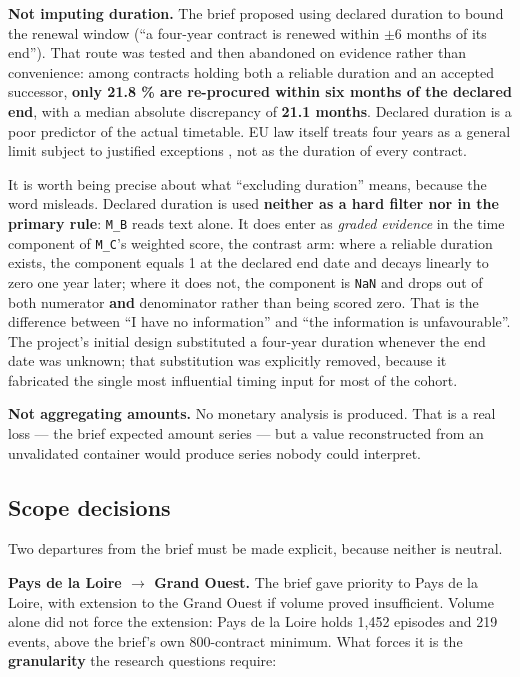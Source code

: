 \textbf{Not imputing duration.} The brief proposed using declared duration to bound the renewal window (``a four-year contract is renewed within $\pm$6 months of its end''). That route was tested and then abandoned on evidence rather than convenience: among contracts holding both a reliable duration and an accepted successor, \textbf{only 21.8 \% are re-procured within six months of the declared end}, with a median absolute discrepancy of \textbf{21.1 months}. Declared duration is a poor predictor of the actual timetable. EU law itself treats four years as a general limit subject to justified exceptions \citep[Art.~33]{eudir2014}, not as the duration of every contract.

It is worth being precise about what ``excluding duration'' means, because the word misleads. Declared duration is
used \textbf{neither as a hard filter nor in the primary rule}: \texttt{M\_B} reads text alone. It does enter as \emph{graded
evidence} in the time component of \texttt{M\_C}'s weighted score, the contrast arm: where a reliable duration exists, the
component equals 1 at the declared end date and decays linearly to zero one year later; where it does not, the
component is \texttt{NaN} and drops out of both numerator \textbf{and} denominator rather than being scored zero. That is the
difference between ``I have no information'' and ``the information is unfavourable''. The project's initial design
substituted a four-year duration whenever the end date was unknown; that substitution was explicitly removed,
because it fabricated the single most influential timing input for most of the cohort.

\textbf{Not aggregating amounts.} No monetary analysis is produced. That is a real loss --- the brief expected amount series --- but a value reconstructed from an unvalidated container would produce series nobody could interpret.

\subsection{Scope decisions}

Two departures from the brief must be made explicit, because neither is neutral.

\textbf{Pays de la Loire $\rightarrow$ Grand Ouest.} The brief gave priority to Pays de la Loire, with extension to the Grand Ouest if volume proved insufficient. Volume alone did not force the extension: Pays de la Loire holds 1,452 episodes and 219 events, above the brief's own 800-contract minimum. What forces it is the \textbf{granularity} the research questions require:


